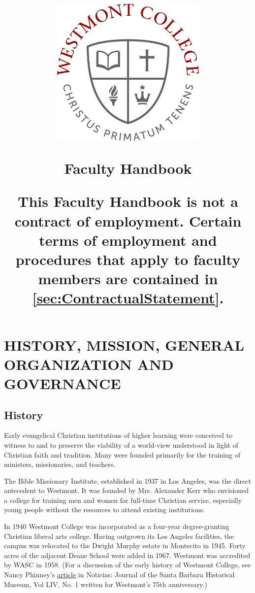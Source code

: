 \documentclass[letterpaper, 11pt]{article}
\date{}
\author{}
\title{

\begin{center}
\includegraphics[width=3in]{images/WestmontSeal.jpg}
\end{center}

\vspace{1in}

{\bfseries \Huge
Faculty Handbook
}


This Faculty Handbook is not a contract of employment.  Certain terms of employment and procedures that apply to faculty members are contained in \autoref{sec:ContractualStatement}.

}
\begin{document}
\fancyhf{} %
\cfoot{\bf -- \thepage\ --}

\renewcommand{\contentsname}{Table of Contents}

\maketitle

\thispagestyle{empty}

\clearpage

\tableofcontents


\setcounter{page}{1}

\clearpage



\setcounter{page}{1} 

\section{HISTORY, MISSION, GENERAL ORGANIZATION AND GOVERNANCE}
\subsection{History}

   Early evangelical Christian institutions of higher learning were conceived to witness to and to preserve the viability of a world-view understood in light of Christian faith and tradition. Many were founded primarily for the training of ministers, missionaries, and teachers.

   The Bible Missionary Institute, established in 1937 in Los Angeles, was the direct antecedent to Westmont. It was founded by Mrs. Alexander Kerr who envisioned a college for training men and women for full-time Christian service, especially young people without the resources to attend existing institutions.

   In 1940 Westmont College was incorporated as a four-year degree-granting Christian liberal arts college. Having outgrown its Los Angeles facilities, the campus was relocated to the Dwight Murphy estate in Montecito in 1945. Forty acres of the adjacent Deane School were added in 1967. Westmont was accredited by WASC in 1958. (For a discussion of the early history of Westmont College, see Nancy Phinney's \href{http://www.santabarbaramuseum.com/noticias-article.pdf}{article} in Noticias: Journal of the Santa Barbara Historical Museum, Vol LIV, No. 1  written for Westmont's 75th anniversary.)
   
\end{document}
